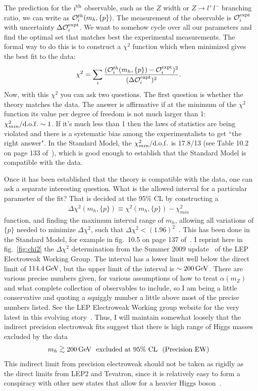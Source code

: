\documentclass[12pt]{article}
\def\beq{\begin{eqnarray}}
\def\eeq{\end{eqnarray}}
\def\gev{\, {\rm GeV}}
\newcommand{\gsim}{\lower.7ex\hbox{$\;\stackrel{\textstyle>}{\sim}\;$}}
\begin{document}
The prediction for the $i^{\rm th}$ observable, such as the $Z$ width or $Z\to l^+l^-$ branching ratio, we can write as ${\cal O}^{th}_i(m_h,\{p\})$.  The measurement of the observable is ${\cal O}^{\rm expt}_i$ with uncertainty $\Delta {\cal O}^{\rm expt}_i$.  We want to somehow cycle over all our parameters and find the optimal set that matches best the experimental measurements. The formal way to do this is to construct a $\chi^2$ function which when minimized gives the best fit to the data:
\beq
\chi^2=\sum_i \frac{({\cal O}^{th}_i(m_h,\{p\})-{\cal O}^{\rm expt}_i)^2}{(\Delta {\cal O}^{\rm expt}_i)^2}.
\eeq
Now, with this $\chi^2$ you can ask two questions. The first question is whether the theory matches the data. The answer is affirmative if at the minimum of the $\chi^2$ function its value per degree of freedom is not much larger than 1: $\chi^2_{min}/{\rm d.o.f.}\sim 1$. If it's much less than 1 then the laws of statistics are being violated and there is a systematic bias among the experimentalists to get ``the right answer".   In the Standard Model, the $\chi^2_{min}/{\rm d.o.f.}$ is 17.8/13 (see Table 10.2 on page 133 of~\cite{Alcaraz:2006mx}), which is good enough to establish that the Standard Model is compatible with the data.

Once it has been established that the theory is compatible with the data, one can ask a separate interesting question. What is the allowed interval for a particular parameter of the fit? That is decided at the 95\% CL by constructing a 
\beq
\Delta\chi^2(m_h,\{p\})\equiv \chi^2(m_h,\{ p\})-\chi^2_{min}
\eeq
function, and finding the maximum interval range of $m_h$, allowing all variations of $\{ p\}$ needed to minimize $\Delta\chi^2$, such that $\Delta\chi^2<(1.96)^2$~\cite{chi2}. This has been done in the Standard Model, for example in fig.\ 10.5 on page 137 of~\cite{Alcaraz:2006mx}. I reprint here in fig.~\ref{fig:chi2} the $\Delta\chi^2$ determination from the Summer 2009 update~\cite{LEPEWWG 2009} of the LEP Electroweak Working Group. The interval has a lower limit well below the direct limit of $114.4\gev$, but the upper limit of the interval is $\sim 200\gev$. There are various precise numbers given, for various assumptions of how to treat $\alpha(m_Z)$ and what complete collection of observables to include, so I am  being a little conservative and quoting a squiggly number a little above most of the precise numbers listed. See the LEP Electroweak Working group website for the very latest in this evolving 
story~\cite{LEPEWWG}. Thus, I will maintain somewhat loosely that the indirect precision electroweak fits suggest that there is high range of Higgs masses excluded by the data
\beq
m_h\gsim 200 \gev~~{\rm excluded~at}~95\%~{\rm CL~~(Precision~ EW)}
\eeq
This indirect limit from precision electroweak should not be taken as rigidly as the direct limits from LEP2 and Tevatron, since it is relatively easy to form a conspiracy with other new states that allow for a heavier Higgs boson~\cite{Peskin:2001rw}.
\end{document}
